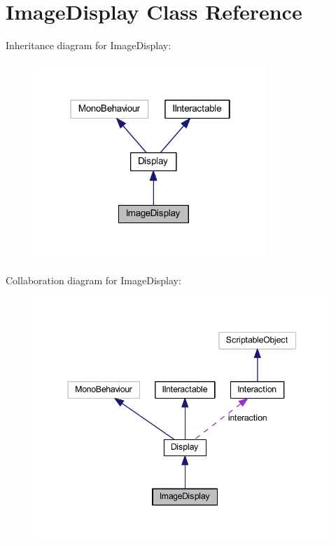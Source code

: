 \hypertarget{class_image_display}{}\section{Image\+Display Class Reference}
\label{class_image_display}


Inheritance diagram for Image\+Display\+:
\nopagebreak
\begin{figure}[H]
\begin{center}
\leavevmode
\includegraphics[width=250pt]{class_image_display__inherit__graph}
\end{center}
\end{figure}


Collaboration diagram for Image\+Display\+:
\nopagebreak
\begin{figure}[H]
\begin{center}
\leavevmode
\includegraphics[width=344pt]{class_image_display__coll__graph}
\end{center}
\end{figure}
